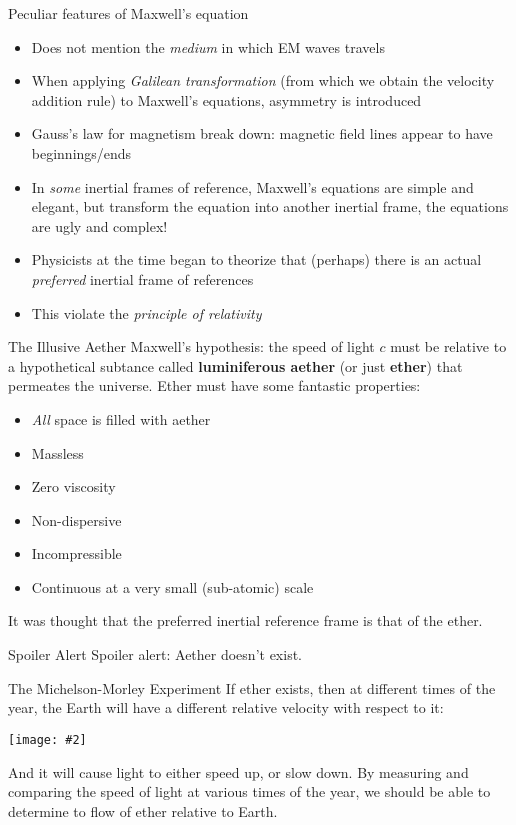 \documentclass[12pt,compress,aspectratio=169]{beamer}
\newcommand{\pic}[2]{\texttt{[image: \#2]}}
\begin{document}
\begin{frame}{Peculiar features of Maxwell's equation}
  \begin{itemize}
  \item Does not mention the \emph{medium} in which EM waves travels
  \item When applying \emph{Galilean transformation} (from which we obtain
    the velocity addition rule) to Maxwell's equations, asymmetry is introduced
  \item Gauss's law for magnetism break down: magnetic field lines appear to
    have beginnings/ends
  \item In \emph{some} inertial frames of reference, Maxwell's equations are
    simple and elegant, but transform the equation into another inertial frame,
    the equations are ugly and complex!
  \item Physicists at the time began to theorize that (perhaps) there is an
    actual \emph{preferred} inertial frame of references
  \item This violate the \emph{principle of relativity}
  \end{itemize}
\end{frame}


\begin{frame}{The Illusive Aether}
  Maxwell's hypothesis: the speed of light $c$ must be relative to a
  hypothetical subtance called \textbf{luminiferous aether} (or just
  \textbf{ether}) that permeates the universe. Ether must have some fantastic
  properties:
  \begin{itemize}
  \item \emph{All} space is filled with aether
  \item Massless
  \item Zero viscosity
  \item Non-dispersive
  \item Incompressible
  \item Continuous at a very small (sub-atomic) scale
  \end{itemize}
  It was thought that the preferred inertial reference frame is that of the
  ether.
\end{frame}
\begin{frame}{Spoiler Alert}
  Spoiler alert: Aether doesn't exist.
\end{frame}



\begin{frame}{The Michelson-Morley Experiment}
  If ether exists, then at different times of the year, the Earth will have a
  different relative velocity with respect to it:
  \begin{center}
    \pic{.4}{graphics/2000px-AetherWind.png}
  \end{center}
  And it will cause light to either speed up, or slow down. By measuring and
  comparing the speed of light at various times of the year, we should be able
  to determine to flow of ether relative to Earth.
\end{frame}
\end{document}
